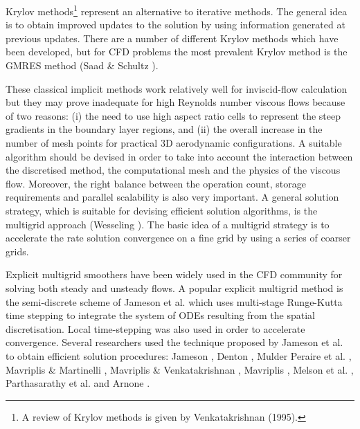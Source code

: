  Krylov methods\footnote{A review of Krylov methods is given by
 Venkatakrishnan (1995).} represent an alternative
 to iterative methods. The general idea
 is to obtain improved updates to the solution by using information generated at
 previous updates.
 There are a number of different Krylov methods which have been developed,
 but for CFD problems the most prevalent Krylov method is the GMRES method
 (Saad \& Schultz ).

 These classical implicit methods work relatively well for inviscid-flow
 calculation but they may prove inadequate for high Reynolds number viscous flows
 because of two reasons: (i) the need to use high aspect
 ratio cells to represent the steep gradients in the
 boundary layer regions, and (ii) the overall increase in the number
 of mesh points for practical 3D aerodynamic configurations.
 A suitable algorithm should be devised in order to take into account the
 interaction between the discretised method, the computational mesh
 and the physics of the viscous flow.
 Moreover, the right balance between the operation count,
 storage requirements and parallel scalability is also very important.
 A general solution strategy, which is suitable for devising
 efficient solution algorithms, is the multigrid approach
 (Wesseling ).
 The basic idea of a multigrid strategy
 is to accelerate the rate solution convergence on a fine grid
 by using a series of coarser grids.
 
 Explicit multigrid smoothers have been widely used in the CFD community
 for solving both steady and unsteady flows. 
 A popular explicit multigrid method is the semi-discrete scheme of Jameson
 et al. \citeyear{Jame:1} which uses multi-stage Runge-Kutta time stepping
 to integrate the system of ODEs resulting from
 the spatial discretisation. Local time-stepping was also used
 in order to accelerate convergence.
 Several researchers used the technique proposed by Jameson
 et al. \citeyear{Jame:1} to obtain efficient solution procedures:
 Jameson \citeyear{Jame:4,Jame:2},
 Denton \citeyear{Denton:3},
 Mulder \citeyear{Mulder:1,Mulder:2}
 Peraire et al. \citeyear{Peiro:3},
 Mavriplis \& Martinelli \citeyear{Mavriplis:1},
 Mavriplis \& Venkatakrishnan \citeyear{Mavriplis:8},
 Mavriplis \citeyear{Mavriplis:4},
 Melson et al. \citeyear{Melson:1},
 Parthasarathy et al. \citeyear{Kallinderis:2} and
 Arnone \citeyear{Arnone:1}.

